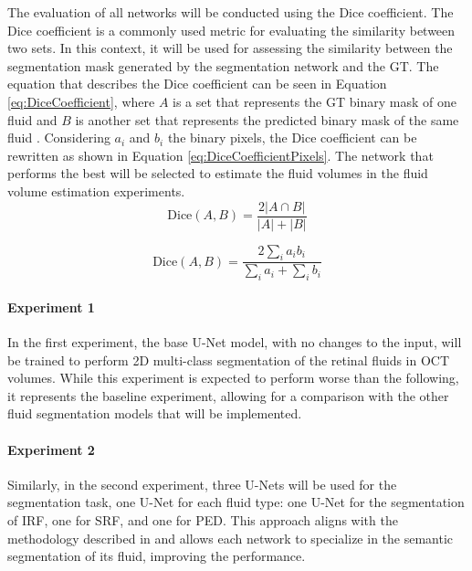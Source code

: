 \par
The evaluation of all networks will be conducted using the Dice coefficient. The Dice coefficient is a commonly used metric for evaluating the similarity between two sets. In this context, it will be used for assessing the similarity between the segmentation mask generated by the segmentation network and the GT. The equation that describes the Dice coefficient can be seen in Equation \ref{eq:DiceCoefficient}, where $A$ is a set that represents the GT binary mask of one fluid and $B$ is another set that represents the predicted binary mask of the same fluid \cite{Shamir2019}. Considering $a_{i}$ and $b_{i}$ the binary pixels, the Dice coefficient can be rewritten as shown in Equation \ref{eq:DiceCoefficientPixels}. The network that performs the best will be selected to estimate the fluid volumes in the fluid volume estimation experiments.
\begin{equation}
	\text{Dice}(A, B) = \frac{2|A \cap B|}{|A| + |B|}
	\label{eq:DiceCoefficient}
\end{equation}

\begin{equation}
	\text{Dice}(A, B) = \frac{2\sum_{i} a_{i} b_{i}}{\sum_{i} a_{i} + \sum_{i} b_{i}}
	\label{eq:DiceCoefficientPixels}
\end{equation}

\paragraph{Experiment 1}
In the first experiment, the base U-Net model, with no changes to the input, will be trained to perform 2D multi-class segmentation of the retinal fluids in OCT volumes. While this experiment is expected to perform worse than the following, it represents the baseline experiment, allowing for a comparison with the other fluid segmentation models that will be implemented.

\paragraph{Experiment 2}
Similarly, in the second experiment, three U-Nets will be used for the segmentation task, one U-Net for each fluid type: one U-Net for the segmentation of IRF, one for SRF, and one for PED. This approach aligns with the methodology described in \textcite{Rahil2023, Padilla2022} and allows each network to specialize in the semantic segmentation of its fluid, improving the performance.

